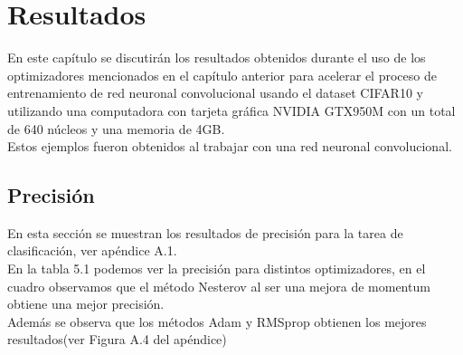 \chapter{Resultados}
En este capítulo se discutirán los resultados obtenidos durante el uso de los optimizadores mencionados en el capítulo anterior para acelerar el proceso de entrenamiento de red neuronal convolucional usando el dataset CIFAR10 y utilizando una computadora con tarjeta gráfica NVIDIA  GTX950M con un total de 640 núcleos y una memoria de 4GB.\\
Estos ejemplos fueron obtenidos al trabajar con una red neuronal convolucional.


\section{Precisión}
En esta sección se muestran los resultados de precisión para la tarea de clasificación, ver apéndice A.1.\\ En la tabla 5.1 podemos ver la precisión para distintos optimizadores, en el cuadro observamos que el método Nesterov al ser una mejora de momentum obtiene una mejor precisión.\\Además se observa que los métodos Adam y RMSprop obtienen los mejores resultados(ver Figura A.4 del apéndice)

